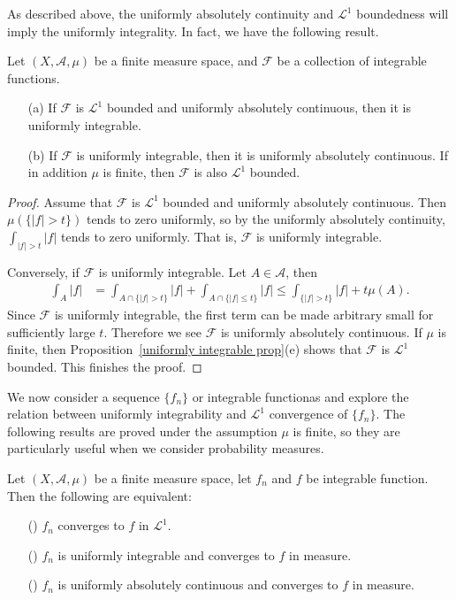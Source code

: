 As described above, the uniformly absolutely continuity and $\mathcal{L}^1$ boundedness will imply the uniformly integrality. In fact, we have the following result.
\begin{theorem}\label{integrable function UI and UAC+L^1 bounded}
Let $(X,\mathcal{A},\mu)$ be a finite measure space, and $\mathscr{F}$ be a collection of integrable functions.
\begin{itemize}
\item[(a)] If $\mathscr{F}$ is $\mathcal{L}^1$ bounded and uniformly absolutely continuous, then it is uniformly integrable.
\item[(b)] If $\mathscr{F}$ is uniformly integrable, then it is uniformly absolutely continuous. If in addition $\mu$ is finite, then $\mathscr{F}$ is also $\mathcal{L}^1$ bounded.
\end{itemize}
\end{theorem}
\begin{proof}
Assume that $\mathscr{F}$ is $\mathcal{L}^1$ bounded and uniformly absolutely continuous. Then $\mu(\{|f|>t\})$ tends to zero uniformly, so by the uniformly absolutely continuity, $\int_{|f|>t}|f|$ tends to zero uniformly. That is, $\mathscr{F}$ is uniformly integrable.\par
Conversely, if $\mathscr{F}$ is uniformly integrable. Let $A\in\mathcal{A}$, then
\begin{align*}
\int_{A}|f|&=\int_{A\cap\{|f|>t\}}|f|+\int_{A\cap\{|f|\leq t\}}|f|\leq\int_{\{|f|>t\}}|f|+t\mu(A).
\end{align*}
Since $\mathscr{F}$ is uniformly integrable, the first term can be made arbitrary small for sufficiently large $t$. Therefore we see $\mathscr{F}$ is uniformly absolutely continuous. If $\mu$ is finite, then Proposition~\ref{uniformly integrable prop}(e) shows that $\mathscr{F}$ is $\mathcal{L}^1$ bounded. This finishes the proof.
\end{proof}
We now consider a sequence $\{f_n\}$ or integrable functionas and explore the relation between uniformly integrability and $\mathcal{L}^1$ convergence of $\{f_n\}$. The following results are proved under the assumption $\mu$ is finite, so they are particularly useful when we consider probability measures.
\begin{theorem}\label{Vitali convergence theorem finite measure}
Let $(X,\mathcal{A},\mu)$ be a finite measure space, let $f_n$ and $f$ be integrable function. Then the following are equivalent:
\begin{itemize}
\item[(\rmnum{1})] $f_n$ converges to $f$ in $\mathcal{L}^1$.
\item[(\rmnum{2})] $f_n$ is uniformly integrable and converges to $f$ in measure.
\item[(\rmnum{3})] $f_n$ is uniformly absolutely continuous and converges to $f$ in measure.
\end{itemize} 
\end{theorem}
